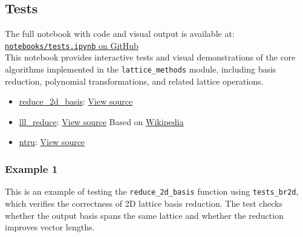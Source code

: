 \documentclass[a4paper,12pt]{article}
\begin{document}


\subsection{Tests}
\noindent
The full notebook with code and visual output is available at:\\
\href{https://github.com/SanyaKor/Cryptanalysis/blob/main/notebooks/tests.ipynb}{\texttt{notebooks/tests.ipynb} on GitHub}
\\


This notebook provides interactive tests and visual demonstrations of the core algorithms implemented in the \texttt{lattice\_methods} module, including basis reduction, polynomial transformations, and related lattice operations.

\begin{itemize}
\item
  \hyperref[-2d-lattice-basis-reduction--interactive-notebook]{reduce\_2d\_basis}:
  \href{https://github.com/SanyaKor/Cryptanalysis/blob/main/lattice_methods/basis_reduction_2d.py}{View source}
\item
  \hyperref[-lll-algorithm-wikipedia-based-implementation--tests]{lll\_reduce}:
  \href{https://github.com/SanyaKor/Cryptanalysis/blob/main/lattice_methods/lll.py}{View source} Based on
  \href{https://en.wikipedia.org/wiki/Lenstra%E2%80%93Lenstra%E2%80%93Lov%C3%A1sz_lattice_basis_reduction_algorithm}{Wikipedia}
\item
  \hyperref[ntru--interactive-notebook]{ntru}:
  \href{https://github.com/SanyaKor/Cryptanalysis/blob/main/lattice_methods/ntru.py}{View source}
\end{itemize}


\subsubsection*{Example 1 }\label{example-3-reference}
This is an example of testing the \texttt{reduce\_2d\_basis} function  
using \texttt{tests\_br2d}, which verifies the correctness of 2D lattice basis reduction.  
The test checks whether the output basis spans the same lattice and whether the reduction improves vector lengths.
\end{document}

